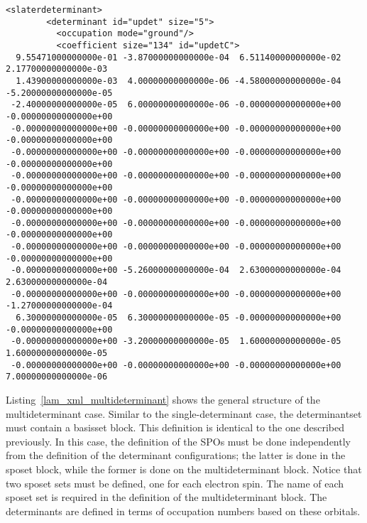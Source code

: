 \begin{lstlisting}[style=QMCPXML,caption=``Sample XML block for the single Slater determinant case.",label=lst:lam_xml_slaterdeterminant]
      <slaterdeterminant>
        <determinant id="updet" size="5">
          <occupation mode="ground"/>
          <coefficient size="134" id="updetC">
  9.55471000000000e-01 -3.87000000000000e-04  6.51140000000000e-02  2.17700000000000e-03
  1.43900000000000e-03  4.00000000000000e-06 -4.58000000000000e-04 -5.20000000000000e-05
 -2.40000000000000e-05  6.00000000000000e-06 -0.00000000000000e+00 -0.00000000000000e+00
 -0.00000000000000e+00 -0.00000000000000e+00 -0.00000000000000e+00 -0.00000000000000e+00
 -0.00000000000000e+00 -0.00000000000000e+00 -0.00000000000000e+00 -0.00000000000000e+00
 -0.00000000000000e+00 -0.00000000000000e+00 -0.00000000000000e+00 -0.00000000000000e+00
 -0.00000000000000e+00 -0.00000000000000e+00 -0.00000000000000e+00 -0.00000000000000e+00
 -0.00000000000000e+00 -0.00000000000000e+00 -0.00000000000000e+00 -0.00000000000000e+00
 -0.00000000000000e+00 -0.00000000000000e+00 -0.00000000000000e+00 -0.00000000000000e+00
 -0.00000000000000e+00 -5.26000000000000e-04  2.63000000000000e-04  2.63000000000000e-04
 -0.00000000000000e+00 -0.00000000000000e+00 -0.00000000000000e+00 -1.27000000000000e-04
  6.30000000000000e-05  6.30000000000000e-05 -0.00000000000000e+00 -0.00000000000000e+00
 -0.00000000000000e+00 -3.20000000000000e-05  1.60000000000000e-05  1.60000000000000e-05
 -0.00000000000000e+00 -0.00000000000000e+00 -0.00000000000000e+00  7.00000000000000e-06
\end{lstlisting}
Listing~\ref{lam_xml_multideterminant} shows the general structure of the multideterminant case. 
Similar to the
single-determinant case, the determinantset must contain a basisset block. This definition is
identical to the one described previously. In this case, the definition of the SPOs
must be done independently from the definition of the determinant configurations; the latter
is done in the sposet block, while the former is done on the multideterminant block. Notice
that two sposet sets must be defined, one for each electron spin. The name of each sposet set
is required in the definition of the multideterminant block. The determinants are defined in
terms of occupation numbers based on these orbitals.

